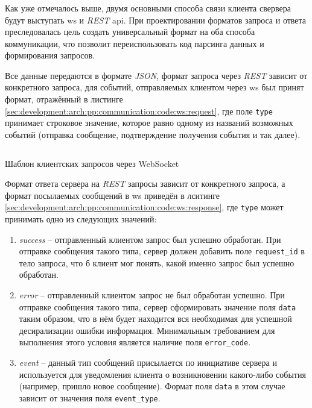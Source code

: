 \subsubsection{}
\label{sec:development:arch:pp:communication}

Как уже отмечалось выше, двумя основными способа связи клиента свервера будут выступать \gls{ws} и \textit{REST} \gls{api}. При проектировании форматов запроса и ответа преследовалась цель создать универсальный формат на оба способа коммуникации, что позволит переиспользовать код парсинга данных и формирования запросов.

Все данные передаются в формате \textit{JSON}, формат запроса через \textit{REST} зависит от конкретного запроса, для событий, отправляемых клиентом через \gls{ws} был принят формат, отражённый в листинге \ref{sec:development:arch:pp:communication:code:ws:request}, где поле \texttt{type} принимает строковое значение, которое равно одному из названий возможных событий (отправка сообщение, подтверждение получения события и так далее).

\begin{code}
	\inputminted{json}{inc/src/client_ws_req_format.json}
   \caption{Шаблон клиентских запросов через WebSocket}
   \label{sec:development:arch:pp:communication:code:ws:request}
\end{code}

Формат ответа сервера на \textit{REST} запросы зависит от конкретного запроса, а формат посылаемых сообщений в \gls{ws} приведён в лситинге \ref{sec:development:arch:pp:communication:code:ws:response}, где \texttt{type} может принимать одно из следующих значений: 

\begin{enumerate}
	\item \textit{success} -- отправленный клиентом запрос был успешно обработан. При отправке сообщения такого типа, сервер должен добавить поле \texttt{request_id} в тело запроса, что б клиент мог понять, какой именно запрос был успешно обработан.
	\item \textit{error} -- отправленный клиентом запрос не был обработан успешно. При отправке сообщения такого типа, сервер сформировать значение поля \texttt{data} таким образом, что в нём будет находится вся необходимая для успешной десирализации ошибки информация. Минимальным требованием для выполнения этого условия является наличие поля \texttt{error_code}.
	\item \textit{event} -- данный тип сообщений присылается по инициативе сервера и используется для уведомления клиента о возникновении какого-либо события (например, пришло новое сообщение). Формат поля \texttt{data} в этом случае зависит от значения поля \texttt{event_type}.
\end{enumerate}

